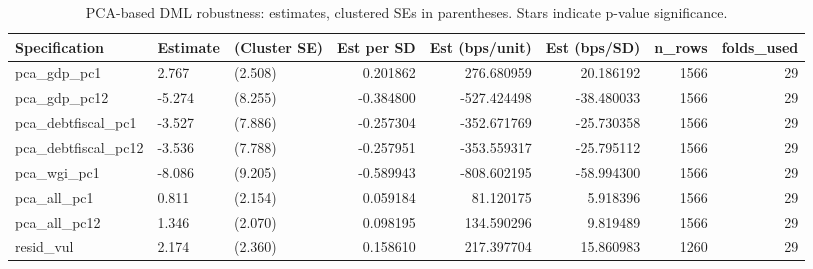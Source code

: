 \begin{table}
\caption{PCA-based DML robustness: estimates, clustered SEs in parentheses. Stars indicate p-value significance.}
\label{tab:pca_robustness}
\begin{tabular}{lllrrrrr}
\toprule
Specification & Estimate & (Cluster SE) & Est per SD & Est (bps/unit) & Est (bps/SD) & n_rows & folds_used \\
\midrule
pca_gdp_pc1 & 2.767 & (2.508) & 0.201862 & 276.680959 & 20.186192 & 1566 & 29 \\
pca_gdp_pc12 & -5.274 & (8.255) & -0.384800 & -527.424498 & -38.480033 & 1566 & 29 \\
pca_debtfiscal_pc1 & -3.527 & (7.886) & -0.257304 & -352.671769 & -25.730358 & 1566 & 29 \\
pca_debtfiscal_pc12 & -3.536 & (7.788) & -0.257951 & -353.559317 & -25.795112 & 1566 & 29 \\
pca_wgi_pc1 & -8.086 & (9.205) & -0.589943 & -808.602195 & -58.994300 & 1566 & 29 \\
pca_all_pc1 & 0.811 & (2.154) & 0.059184 & 81.120175 & 5.918396 & 1566 & 29 \\
pca_all_pc12 & 1.346 & (2.070) & 0.098195 & 134.590296 & 9.819489 & 1566 & 29 \\
resid_vul & 2.174 & (2.360) & 0.158610 & 217.397704 & 15.860983 & 1260 & 29 \\
\bottomrule
\end{tabular}
\end{table}

